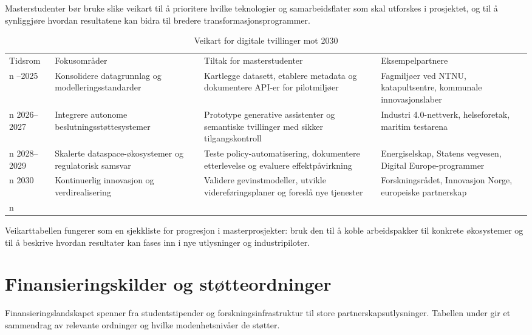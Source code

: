 Masterstudenter bør bruke slike veikart til å prioritere hvilke teknologier og samarbeidsflater som skal utforskes i prosjektet, og til å synliggjøre hvordan resultatene kan bidra til bredere transformasjonsprogrammer.

\begin{table}[h]
    \centering
    \caption{Veikart for digitale tvillinger mot 2030}
    \label{tab:roadmap2030}
    \begin{tabular}{p{2.4cm}p{4.1cm}p{4.1cm}p{3.0cm}}
        \toprule
        Tidsrom & Fokusområder & Tiltak for masterstudenter & Eksempelpartnere \\n        \midrule
        2024--2025 & Konsolidere datagrunnlag og modelleringsstandarder & Kartlegge datasett, etablere metadata og dokumentere API-er for pilotmiljøer & Fagmiljøer ved NTNU, katapultsentre, kommunale innovasjonslaber \\n        2026--2027 & Integrere autonome beslutningsstøttesystemer & Prototype generative assistenter og semantiske tvillinger med sikker tilgangskontroll & Industri 4.0-nettverk, helseforetak, maritim testarena \\n        2028--2029 & Skalerte dataspace-økosystemer og regulatorisk samsvar & Teste policy-automatisering, dokumentere etterlevelse og evaluere effektpåvirkning & Energiselskap, Statens vegvesen, Digital Europe-programmer \\n        2030 & Kontinuerlig innovasjon og verdirealisering & Validere gevinstmodeller, utvikle videreføringsplaner og foreslå nye tjenester & Forskningsrådet, Innovasjon Norge, europeiske partnerskap \\n        \bottomrule
    \end{tabular}
\end{table}

Veikarttabellen fungerer som en sjekkliste for progresjon i masterprosjekter: bruk den til å koble arbeidspakker til konkrete økosystemer og til å beskrive hvordan resultater kan fases inn i nye utlysninger og industripiloter.

\section{Finansieringskilder og støtteordninger}
Finansieringslandskapet spenner fra studentstipender og forskningsinfrastruktur til store partnerskapsutlysninger. Tabellen under gir et sammendrag av relevante ordninger og hvilke modenhetsnivåer de støtter.

